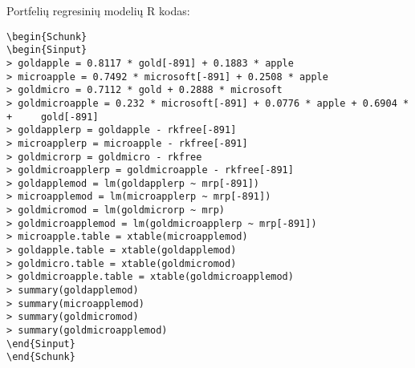 \documentclass[12pt, a14paper, lithuanian]{article}
\begin{document}
 Portfelių regresinių modelių R kodas:
\begin{verbatim}
\begin{Schunk}
\begin{Sinput}
> goldapple = 0.8117 * gold[-891] + 0.1883 * apple
> microapple = 0.7492 * microsoft[-891] + 0.2508 * apple
> goldmicro = 0.7112 * gold + 0.2888 * microsoft
> goldmicroapple = 0.232 * microsoft[-891] + 0.0776 * apple + 0.6904 * 
+     gold[-891]
> goldapplerp = goldapple - rkfree[-891]
> microapplerp = microapple - rkfree[-891]
> goldmicrorp = goldmicro - rkfree
> goldmicroapplerp = goldmicroapple - rkfree[-891]
> goldapplemod = lm(goldapplerp ~ mrp[-891])
> microapplemod = lm(microapplerp ~ mrp[-891])
> goldmicromod = lm(goldmicrorp ~ mrp)
> goldmicroapplemod = lm(goldmicroapplerp ~ mrp[-891])
> microapple.table = xtable(microapplemod)
> goldapple.table = xtable(goldapplemod)
> goldmicro.table = xtable(goldmicromod)
> goldmicroapple.table = xtable(goldmicroapplemod)
> summary(goldapplemod)
> summary(microapplemod)
> summary(goldmicromod)
> summary(goldmicroapplemod)
\end{Sinput}
\end{Schunk}
\end{verbatim}
\end{document}
